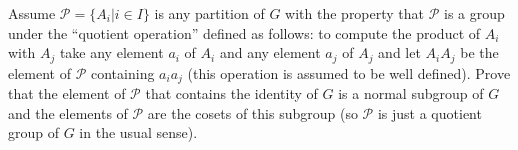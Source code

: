 \documentclass[12 pt, letterpaper]{hmcpset}
\begin{document}
\pagebreak

\begin{problem}
	Assume $\mathcal{P} = \{ A_{i} | i \in I \}$ is any partition of $G$ with the property that $\mathcal{P}$ is a group under the ``quotient operation'' defined as follows: to compute the product of $A_{i}$ with $A_{j}$ take any element $a_{i}$ of $A_{i}$ and any element $a_{j}$ of $A_{j}$ and let $A_{i}A_{j}$ be the element of $\mathcal{P}$ containing $a_{i}a_{j}$ (this operation is assumed to be well defined). Prove that the element of $\mathcal{P}$ that contains the identity of $G$ is a normal subgroup of $G$ and the elements of $\mathcal{P}$ are the cosets of this subgroup (so $\mathcal{P}$ is just a quotient group of $G$ in the usual sense).
\end{problem}
\end{document}
